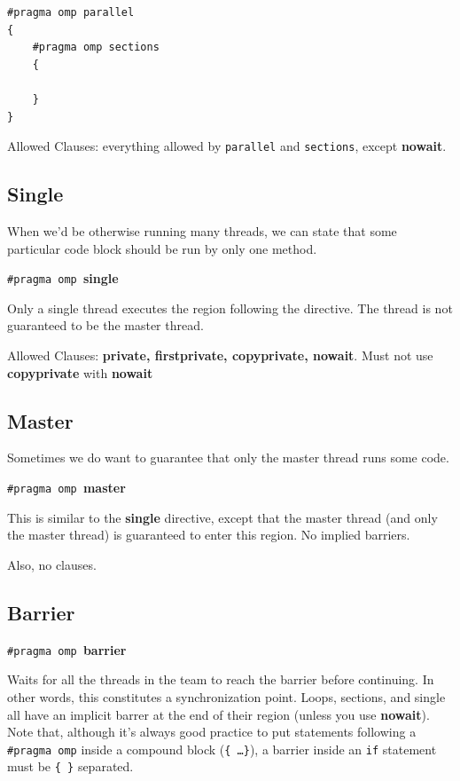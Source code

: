 \documentclass[a4paper]{report}
\begin{document}
  \begin{lstlisting}
#pragma omp parallel
{
    #pragma omp sections
    {

    }
}
  \end{lstlisting}

  Allowed Clauses: everything allowed by {\tt parallel} and {\tt sections}, except
  {\bf nowait}.

  \subsection*{Single} When we'd be otherwise running many threads, we can state
that some particular code block should be run by only one method.

  \begin{center}
    {\tt \#pragma omp }{\bf single}
  \end{center}
    Only a single thread executes the region following the directive.
    The thread is not guaranteed to be the master thread.

  Allowed Clauses: {\bf private, firstprivate, copyprivate, nowait}.
 Must not use {\bf copyprivate} with {\bf nowait}


  \subsection*{Master} Sometimes we do want to guarantee that only the master
thread runs some code.
  \begin{center}
    {\tt \#pragma omp }{\bf master}
  \end{center}

    This is similar to the {\bf single} directive, except that the master thread (and only the master thread) is guaranteed to enter this region.
    No implied barriers. 

Also, no clauses.

 \subsection*{Barrier}

  \begin{center}
    {\tt \#pragma omp }{\bf barrier}
  \end{center}

     Waits for all the threads in the team to reach the barrier before
      continuing. In other words, this constitutes a synchronization point.
     Loops, sections, and single all have an implicit barrer at the end of their
      region (unless you use {\bf nowait}).
     Note that, although it's always good practice to put statements following a {\tt \#pragma omp} inside a compound block ({\tt \{ \ldots \}}), a barrier inside an {\tt if} statement must be {\tt \{  \}} separated.
\end{document}
